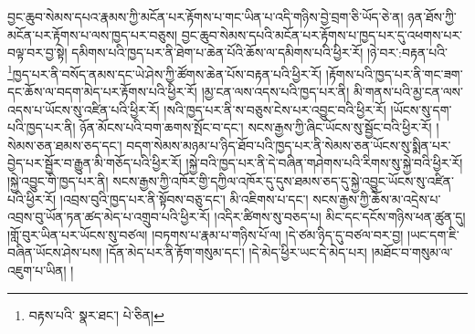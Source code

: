 བྱང་ཆུབ་སེམས་དཔའ་རྣམས་ཀྱི་མངོན་པར་རྟོགས་པ་གང་ཡིན་པ་འདི་གཉིས་བྱེ་བྲག་ཅི་ཡོད་ཅེ་ན། ཉན་ཐོས་ཀྱི་མངོན་པར་རྟོགས་པ་ལས་ཁྱད་པར་བཅུས། བྱང་ཆུབ་སེམས་དཔའི་མངོན་པར་རྟོགས་པ་ཁྱད་པར་དུ་འཕགས་པར་བལྟ་བར་བྱ་སྟེ། དམིགས་པའི་ཁྱད་པར་ནི་ཐེག་པ་ཆེན་པོའི་ཆོས་ལ་དམིགས་པའི་ཕྱིར་རོ། །ཉེ་བར་:བརྟན་པའི་\footnote{བརྟས་པའི་  སྣར་ཐང་།  པེ་ཅིན། }ཁྱད་པར་ནི་བསོད་ནམས་དང་ཡེ་ཤེས་ཀྱི་ཚོགས་ཆེན་པོས་བརྟན་པའི་ཕྱིར་རོ། །རྟོགས་པའི་ཁྱད་པར་ནི་གང་ཟག་དང་ཆོས་ལ་བདག་མེད་པར་རྟོགས་པའི་ཕྱིར་རོ། །མྱ་ངན་ལས་འདས་པའི་ཁྱད་པར་ནི། མི་གནས་པའི་མྱ་ངན་ལས་འདས་པ་ཡོངས་སུ་འཛིན་པའི་ཕྱིར་རོ། །སའི་ཁྱད་པར་ནི་ས་བཅུས་ངེས་པར་འབྱུང་བའི་ཕྱིར་རོ། །ཡོངས་སུ་དག་པའི་ཁྱད་པར་ནི། ཉོན་མོངས་པའི་བག་ཆགས་སྤོང་བ་དང་། སངས་རྒྱས་ཀྱི་ཞིང་ཡོངས་སུ་སྦྱོང་བའི་ཕྱིར་རོ། །སེམས་ཅན་ཐམས་ཅད་དང་། བདག་སེམས་མཉམ་པ་ཉིད་ཐོབ་པའི་ཁྱད་པར་ནི་སེམས་ཅན་ཡོངས་སུ་སྨིན་པར་བྱེད་པར་སྦྱོར་བ་རྒྱུན་མི་གཅོད་པའི་ཕྱིར་རོ། །སྐྱེ་བའི་ཁྱད་པར་ནི་དེ་བཞིན་གཤེགས་པའི་རིགས་སུ་སྐྱེ་བའི་ཕྱིར་རོ། །སྐྱེ་འབྱུང་གི་ཁྱད་པར་ནི། སངས་རྒྱས་ཀྱི་འཁོར་གྱི་དཀྱིལ་འཁོར་དུ་དུས་ཐམས་ཅད་དུ་སྐྱེ་འབྱུང་ཡོངས་སུ་འཛིན་པའི་ཕྱིར་རོ། །འབྲས་བུའི་ཁྱད་པར་ནི་སྟོབས་བཅུ་དང་། མི་འཇིགས་པ་དང་། སངས་རྒྱས་ཀྱི་ཆོས་མ་འདྲེས་པ་འབྲས་བུ་ཡོན་ཏན་ཚད་མེད་པ་འགྲུབ་པའི་ཕྱིར་རོ། །འདིར་ཚིགས་སུ་བཅད་པ། མིང་དང་དངོས་གཉིས་ཕན་ཚུན་དུ། །གློ་བུར་ཡིན་པར་ཡོངས་སུ་བཙལ། །བཏགས་པ་རྣམ་པ་གཉིས་པོ་ལ། །དེ་ཙམ་ཉིད་དུ་བཙལ་བར་བྱ། །ཡང་དག་ཇི་བཞིན་ཡོངས་ཤེས་པས། །དོན་མེད་པར་ནི་རྟོག་གསུམ་དང་། །དེ་མེད་ཕྱིར་ཡང་དེ་མེད་པར། །མཐོང་བ་གསུམ་ལ་འཇུག་པ་ཡིན། །
